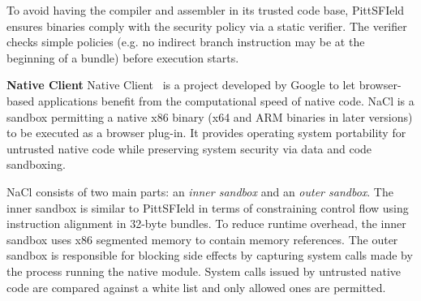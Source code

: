 \documentclass[conference]{IEEEtran}
\begin{document}



To avoid having the compiler and assembler in its trusted code base, PittSFIeld ensures binaries comply with the security policy via a static verifier. The verifier checks simple policies (e.g. no indirect branch instruction may be at the beginning of a bundle) before execution starts.

\textbf{Native Client}
Native Client~\cite{yeeNaCl} is a project developed by Google to let browser-based applications benefit from the computational speed of native code.  NaCl is a sandbox permitting a native x86 binary (x64 and ARM binaries in later versions)  to be executed as a browser plug-in. It provides operating system portability for  untrusted native code while  preserving system security  via data and code sandboxing. 

NaCl consists of two main parts: an \textit{inner sandbox} and an \textit{outer sandbox}. The inner sandbox is  similar to PittSFIeld in terms of constraining control flow using instruction alignment in 32-byte bundles. To reduce runtime overhead, the inner sandbox uses  x86 segmented memory to contain memory references. The outer sandbox is responsible for blocking  side effects by capturing system calls made by the process running the native module. System calls issued by untrusted native code are compared against a white list and only allowed ones are permitted.
\end{document}
